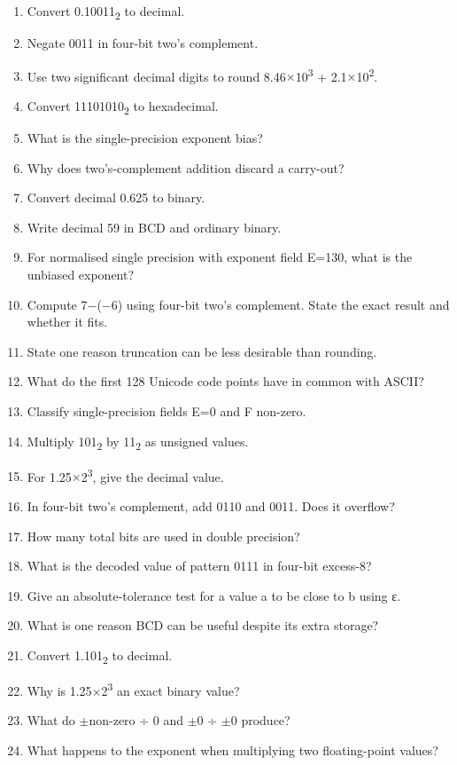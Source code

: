 \documentclass[11pt]{article}
\begin{document}
\begin{keepsection}
\begin{enumerate}
\item Convert 0.10011\textsubscript{2} to decimal.
\item Negate 0011 in four-bit two’s complement.
\item Use two significant decimal digits to round 8.46\ensuremath{\times}10\textsuperscript{3} + 2.1\ensuremath{\times}10\textsuperscript{2}.
\item Convert 11101010\textsubscript{2} to hexadecimal.
\item What is the single-precision exponent bias?
\item Why does two’s-complement addition discard a carry-out?
\item Convert decimal 0.625 to binary.
\item Write decimal 59 in BCD and ordinary binary.
\item For normalised single precision with exponent field E=130, what is the unbiased exponent?
\item Compute 7\ensuremath{-}(\ensuremath{-}6) using four-bit two’s complement. State the exact result and whether it fits.
\item State one reason truncation can be less desirable than rounding.
\item What do the first 128 Unicode code points have in common with ASCII?
\item Classify single-precision fields E=0 and F non-zero.
\item Multiply 101\textsubscript{2} by 11\textsubscript{2} as unsigned values.
\item For 1.25\ensuremath{\times}2\textsuperscript{3}, give the decimal value.
\item In four-bit two’s complement, add 0110 and 0011. Does it overflow?
\item How many total bits are used in double precision?
\item What is the decoded value of pattern 0111 in four-bit excess-8?
\item Give an absolute-tolerance test for a value a to be close to b using ε.
\item What is one reason BCD can be useful despite its extra storage?
\item Convert 1.101\textsubscript{2} to decimal.
\item Why is 1.25\ensuremath{\times}2\textsuperscript{3} an exact binary value?
\item What do \ensuremath{\pm}non-zero ÷ 0 and \ensuremath{\pm}0 ÷ \ensuremath{\pm}0 produce?
\item What happens to the exponent when multiplying two floating-point values?

\end{enumerate}
\end{keepsection}
\end{document}
